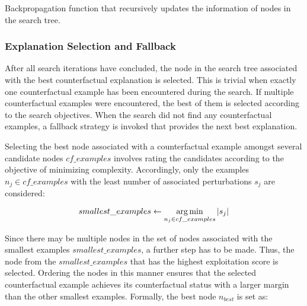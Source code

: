 {
\setlength{\algomargin}{1.25em}
\small
\begin{algorithm}[ht]
\caption{Backpropagation function that recursively updates the information of nodes in the search tree.}
\label{a_MCTS_Backpropagation}
\end{algorithm}
}



\subsubsection{Explanation Selection and Fallback}
\label{s_Methodology_CoDy_Fallback}
After all search iterations have concluded, the node in the search tree associated with the best counterfactual explanation is selected. This is trivial when exactly one counterfactual example has been encountered during the search. If multiple counterfactual examples were encountered, the best of them is selected according to the search objectives. When the search did not find any counterfactual examples, a fallback strategy is invoked that provides the next best explanation.

Selecting the best node associated with a counterfactual example amongst several candidate nodes \(cf\_examples\) involves rating the candidates according to the objective of minimizing complexity. Accordingly, only the examples $n_j \in cf\_examples$ with the least number of associated perturbations $s_j$ are considered:

\begin{equation}
    smallest\_examples \gets \operatorname*{arg\,min}_{n_j \in cf\_examples} |s_j|
\end{equation}

Since there may be multiple nodes in the set of nodes associated with the smallest examples $smallest\_examples$, a further step has to be made. Thus, the node from the $smallest\_examples$ that has the highest exploitation score is selected. Ordering the nodes in this manner ensures that the selected counterfactual example achieves its counterfactual status with a larger margin than the other smallest examples. Formally, the best node $n_{best}$ is set as:

